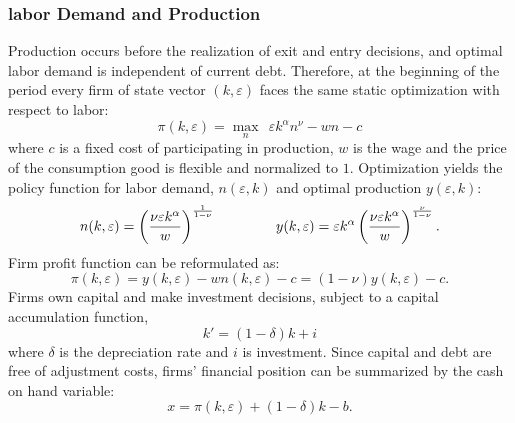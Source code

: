 \documentclass[12pt]{article}
\begin{document}
\subsubsection{labor Demand and Production \label{sec:labor demand}}
Production occurs before the realization of exit and entry decisions, and optimal labor demand is independent of current debt. Therefore, at the beginning of the period every firm of state vector $(k,\varepsilon)$ faces the same static optimization with respect to labor: 
$$ \pi(k,\varepsilon) = \max_{n} \ \  \varepsilon k^{\alpha}n^{\nu} - wn - c$$
where $c$ is a fixed cost of participating in production, $w$ is the wage and the price of the consumption good is flexible and normalized to $1$. Optimization yields the policy function for labor demand, $n(\varepsilon,k)$ and optimal production $y(\varepsilon,k)$: 
\begin{equation} \label{eq:opt_emp_prod}
n(k,\varepsilon) = \left( \dfrac{ \nu \varepsilon k^\alpha}{w} \right)^{\frac{1}{1-\nu}} \hspace{15mm}
y(k,\varepsilon) = \varepsilon k^{\alpha} \left( \dfrac{\nu \varepsilon k^\alpha}{w} \right)^{\frac{\nu}{1-\nu}}.
\end{equation}  
Firm profit function can be reformulated as: 
\begin{equation} \label{eq:profit}
\pi(k,\varepsilon) = y(k,\varepsilon) - wn(k,\varepsilon) - c = (1-\nu) y(k,\varepsilon) - c.
\end{equation} 
Firms own capital and make investment decisions, subject to a capital accumulation function,
\begin{equation} \label{eq:capital}
k' = (1-\delta)k + i
\end{equation} 
where $\delta$ is the depreciation rate and $i$ is investment. Since capital and debt are free of adjustment costs, firms' financial position can be summarized by the cash on hand variable:
\begin{equation} \label{eq:cash on hand}
    x = \pi(k,\varepsilon) + (1-\delta)k - b.
\end{equation}
\end{document}
